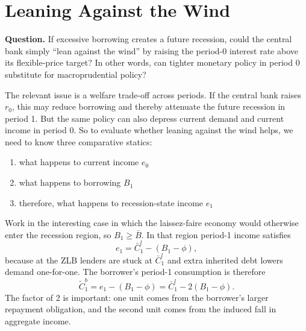 \documentclass[11pt,a4paper]{article}
\begin{document}

\section{Leaning Against the Wind}\label{sec:mp}

\textbf{Question.} If excessive borrowing creates a future recession, could the central bank simply ``lean against the wind'' by raising the period-0 interest rate above its flexible-price target? In other words, can tighter monetary policy in period 0 substitute for macroprudential policy?

The relevant issue is a welfare trade-off across periods. If the central bank raises $r_0$, this may reduce borrowing and thereby attenuate the future recession in period 1. But the same policy can also depress current demand and current income in period 0. So to evaluate whether leaning against the wind helps, we need to know three comparative statics:
\begin{enumerate}
    \item what happens to current income $e_0$
    \item what happens to borrowing $B_1$
    \item therefore, what happens to recession-state income $e_1$
\end{enumerate}

Work in the interesting case in which the laissez-faire economy would otherwise enter the recession region, so $B_1 \geq \bar{B}$. In that region period-1 income satisfies
\begin{equation}\label{eq:mp-recession-law}
e_1 = \bar{C}_1^l - (B_1-\phi),
\end{equation}
because at the ZLB lenders are stuck at $\bar{C}_1^l$ and extra inherited debt lowers demand one-for-one. The borrower's period-1 consumption is therefore
\begin{equation}\label{eq:mp-borrower-c1}
\tilde{C}_1^b = e_1-(B_1-\phi) = \bar{C}_1^l-2(B_1-\phi).
\end{equation}
The factor of 2 is important: one unit comes from the borrower's larger repayment obligation, and the second unit comes from the induced fall in aggregate income.
\end{document}
